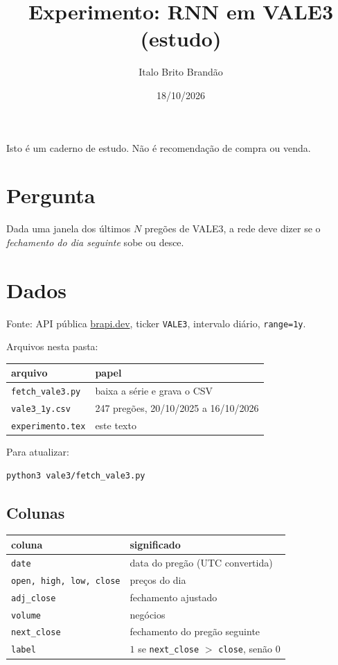\documentclass[11pt]{article}
\title{Experimento: RNN em VALE3 (estudo)}
\author{Italo Brito Brandão}
\date{18/10/2026}
\begin{document}
\maketitle

\noindent
Isto é um caderno de estudo. Não é recomendação de compra ou venda.

\section{Pergunta}

Dada uma janela dos últimos \(N\) pregões de VALE3, a rede deve dizer se o \emph{fechamento do dia seguinte} sobe ou desce.

\section{Dados}

Fonte: API pública \href{https://brapi.dev}{brapi.dev}, ticker \texttt{VALE3}, intervalo diário, \texttt{range=1y}.

Arquivos nesta pasta:

\begin{center}
\begin{tabular}{ll}
  \toprule
  arquivo & papel \\
  \midrule
  \texttt{fetch\_vale3.py} & baixa a série e grava o CSV \\
  \texttt{vale3\_1y.csv} & 247 pregões, 20/10/2025 a 16/10/2026 \\
  \texttt{experimento.tex} & este texto \\
  \bottomrule
\end{tabular}
\end{center}

Para atualizar:

\begin{verbatim}
python3 vale3/fetch_vale3.py
\end{verbatim}

\subsection{Colunas}

\begin{center}
\begin{tabular}{ll}
  \toprule
  coluna & significado \\
  \midrule
  \texttt{date} & data do pregão (UTC convertida) \\
  \texttt{open, high, low, close} & preços do dia \\
  \texttt{adj\_close} & fechamento ajustado \\
  \texttt{volume} & negócios \\
  \texttt{next\_close} & fechamento do pregão seguinte \\
  \texttt{label} & \(1\) se \texttt{next\_close} \(>\) \texttt{close}, senão \(0\) \\
  \bottomrule
\end{tabular}
\end{center}
\end{document}
